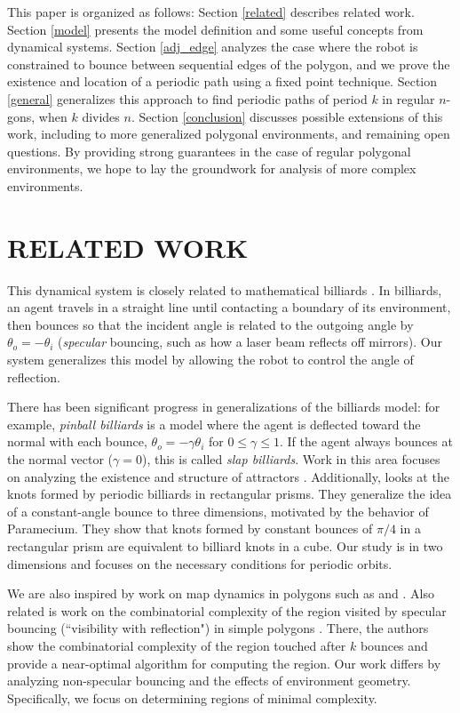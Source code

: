 \documentclass[letterpaper, 10 pt, conference]{ieeeconf}  %
\begin{document}
This paper is organized as follows: Section \ref{related} describes related work.
Section \ref{model} presents the model definition and
some useful concepts from dynamical systems. Section \ref{adj_edge} analyzes the 
case where the robot is constrained to bounce between sequential edges of the
polygon, and we prove the existence and location of a periodic path using a
fixed point technique.
Section \ref{general} generalizes this approach to find periodic paths of period $k$ in
regular $n$-gons, when $k$ divides $n$. Section \ref{conclusion} discusses possible extensions
of this work, including to more generalized polygonal environments, and
remaining open questions. By providing strong guarantees in the case of regular
polygonal environments, we hope to lay the groundwork for analysis of more
complex environments. 


\section{RELATED WORK\label{related}} 

This dynamical system is closely related to mathematical billiards
\cite{billiards}. In billiards, an agent travels in a straight line until
contacting a boundary of its environment, then bounces so that the incident
angle is related to the outgoing angle by $\theta_{o} = -\theta_{i}$
(\textit{specular} bouncing, such as how a laser beam
reflects off mirrors). Our system
generalizes this model by allowing the robot to control the angle of reflection.

There has been significant progress in generalizations of the billiards model: for example, 
\textit{pinball billiards} is a model where the agent is deflected toward the
normal with each bounce, $\theta_{o} = - \gamma \theta_{i}$ for
$0 \leq \gamma \leq 1$. If the agent always bounces at the normal vector
($\gamma = 0$), this is called \textit{slap billiards}. Work in this area focuses on
analyzing the existence and structure of attractors \cite{pinball} \cite{DelMagno2014}.
Additionally, \cite{Jones1998} looks at the knots formed by periodic billiards
in rectangular prisms. They generalize
the idea of a constant-angle bounce to
three dimensions, motivated by the behavior of Paramecium. They show that knots
formed by constant bounces of $\pi/4$ in a rectangular prism are equivalent to
billiard knots in a cube. Our study is in two dimensions and focuses on the
necessary conditions for periodic orbits.

We are also inspired by work on map dynamics in polygons such as
\cite{schwartz_billiards} and \cite{schwartz1992}. Also related is work on the
combinatorial complexity of the region visited
by specular bouncing (``visibility with reflection") in simple polygons
\cite{Aronov1996}. There, the authors show the combinatorial complexity of the
region touched after $k$ bounces and provide a near-optimal algorithm for
computing the region. Our work differs by analyzing non-specular bouncing and
the effects of environment geometry. Specifically, we focus on determining
regions of minimal complexity.
\end{document}
